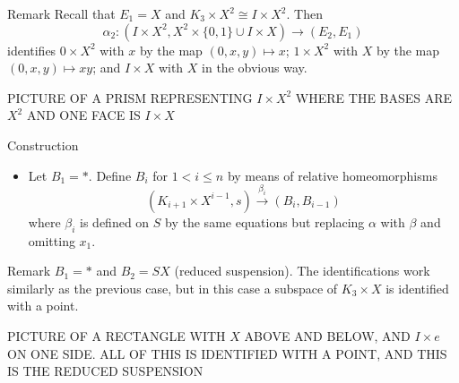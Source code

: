 \documentclass{beamer}
\theoremstyle{definition}
\begin{document}
\begin{frame}
\begin{block}{Remark}
Recall that $E_1=X$ and $K_3\times X^2\cong I\times X^2$.
Then \[\alpha_2:(I\times X^2, X^2\times\{0,1\}\cup I\times X)\to (E_2,E_1)\] identifies $0\times X^2$ with $x$ by the map $(0,x,y)\mapsto x$; $1\times X^2$ with $X$ by the map $(0,x,y)\mapsto xy$; and $I\times X$ with $X$ in the obvious way. %
\end{block}
PICTURE OF A PRISM REPRESENTING $I\times X^2$ WHERE THE BASES ARE $X^2$ AND ONE FACE IS $I\times X$
\end{frame}

\begin{frame}
\begin{block}{Construction}
\begin{itemize}
\item Let $B_1=*$. Define $B_i$ for $1<i\leq n$ by means of relative homeomorphisms %
\[
(K_{i+1}\times X^{i-1},s)\xrightarrow{\beta_i} (B_i,B_{i-1})
\]
where $\beta_i$ is defined on $S$ by the same equations but replacing $\alpha$ with $\beta$ and omitting $x_1$.
\end{itemize}
\end{block}
\end{frame}

\begin{frame}
\begin{block}{Remark}
$B_1=*$ and $B_2=SX$ (reduced suspension). %
The identifications work similarly as the previous case, but in this case a subspace of $K_3\times X$ is identified with a point.
\end{block}
PICTURE OF A RECTANGLE WITH $X$ ABOVE AND BELOW, AND $I\times e$ ON ONE SIDE. ALL OF THIS IS IDENTIFIED WITH A POINT, AND THIS IS THE REDUCED SUSPENSION
\end{frame}
\end{document}
